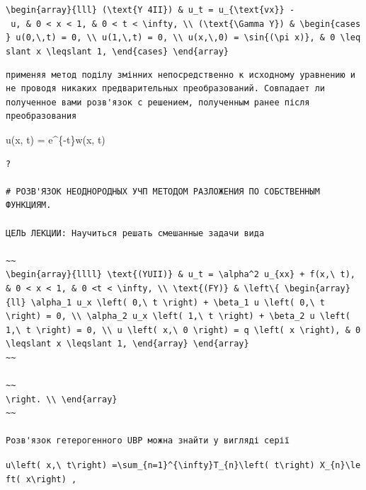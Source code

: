 \documentclass[
  ukrainian,
]{article}
\begin{document}
\texttt{\textbackslash{}begin\{array\}\{lll\}\ (\textbackslash{}text\{Y\ 4II\})\ \&\ u\_t\ =\ u\_\{\textbackslash{}text\{vx\}\}\ -\ u,\ \&\ 0\ \textless{}\ x\ \textless{}\ 1,\ \&\ 0\ \textless{}\ t\ \textless{}\ \textbackslash{}infty,\ \textbackslash{}\textbackslash{}\ (\textbackslash{}text\{\textbackslash{}Gamma\ Y\})\ \&\ \textbackslash{}begin\{cases\}\ u(0,\textbackslash{},t)\ =\ 0,\ \textbackslash{}\textbackslash{}\ u(1,\textbackslash{},t)\ =\ 0,\ \textbackslash{}\textbackslash{}\ u(x,\textbackslash{},0)\ =\ \textbackslash{}sin\{(\textbackslash{}pi\ x)\},\ \&\ 0\ \textbackslash{}leqslant\ x\ \textbackslash{}leqslant\ 1,\ \textbackslash{}end\{cases\}\ \textbackslash{}end\{array\}}

\begin{verbatim}
применяя метод поділу змінних непосредственно к исходному уравнению и не проводя никаких предварительных преобразований. Совпадает ли полученное вами розв'язок с решением, полученным ранее після преобразования
\end{verbatim}

u(x, t) = e\^{}\{-t\}w(x, t)

\begin{verbatim}
?

# РОЗВ'ЯЗОК НЕОДНОРОДНЫХ УЧП МЕТОДОМ РАЗЛОЖЕНИЯ ПО СОБСТВЕННЫМ ФУНКЦИЯМ.

ЦЕЛЬ ЛЕКЦИИ: Научиться решать смешанные задачи вида

~~
\begin{array}{llll} \text{(YUII)} & u_t = \alpha^2 u_{xx} + f(x,\ t), & 0 < x < 1, & 0 <t < \infty, \\ \text{(FY)} & \left\{ \begin{array}{ll} \alpha_1 u_x \left( 0,\ t \right) + \beta_1 u \left( 0,\ t \right) = 0, \\ \alpha_2 u_x \left( 1,\ t \right) + \beta_2 u \left( 1,\ t \right) = 0, \\ u \left( x,\ 0 \right) = q \left( x \right), & 0 \leqslant x \leqslant 1, \end{array} \end{array}
~~

~~
\right. \\ \end{array}
~~

Розв'язок гетерогенного UBP можна знайти у вигляді серії
\end{verbatim}

\texttt{u\textbackslash{}left(\ x,\textbackslash{}\ t\textbackslash{}right)\ =\textbackslash{}sum\_\{n=1\}\^{}\{\textbackslash{}infty\}T\_\{n\}\textbackslash{}left(\ t\textbackslash{}right)\ X\_\{n\}\textbackslash{}left(\ x\textbackslash{}right)\ ,}
\end{document}
